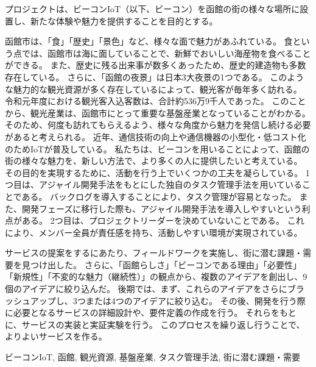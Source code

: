 \documentclass[openany,11pt,papersize]{jsbook}
\begin{document}
%
\maketitle

\frontmatter

\begin{jabstract} 
プロジェクトは、ビーコンIoT（以下、ビーコン）を函館の街の様々な場所に設置し、新たな体験や魅力を提供することを目的とする。

函館市は、「食」「歴史」「景色」など、様々な面で魅力があふれている。
食という点では、函館市は海に面していることで、新鮮でおいしい海産物を食べることができる。
また、歴史に残る出来事が数多くあったため、歴史的建造物も多数存在している。
さらに、「函館の夜景」は日本3大夜景の1つである。
このような魅力的な観光資源が多く存在しているによって、観光客が毎年多く訪れる。
令和元年度における観光客入込客数は、合計約536万9千人であった。
このことから、観光産業は、函館市にとって重要な基盤産業となっていることがわかる。
そのため、何度も訪れてもらえるよう、様々な角度から魅力を発信し続ける必要があると考えられる。
近年、通信技術の向上や通信機器の小型化・低コスト化のためIoTが普及している。
私たちは、ビーコンを用いることによって、函館の街の様々な魅力を、新しい方法で、より多くの人に提供したいと考えている。
その目的を実現するために、活動を行う上でいくつかの工夫を凝らしている。
1つ目は、アジャイル開発手法をもとにした独自のタスク管理手法を用いていることである。
バックログを導入することにより、タスク管理が容易となった。
また、開発フェーズに移行した際も、アジャイル開発手法を導入しやすいという利点がある。
2つ目は、プロジェクトリーダーを決めていないことである。
これにより、メンバー全員が責任感を持ち、活動しやすい環境が実現されている。

サービスの提案をするにあたり、フィールドワークを実施し、街に潜む課題・需要を見つけ出した。
さらに、「函館らしさ」「ビーコンである理由」「必要性」「新規性」「不変的な魅力（継続性）」の観点から、複数のアイデアを創出し、9個のアイデアに絞り込んだ。
後期では、まず、これらのアイデアをさらにブラッシュアップし、3つまたは4つのアイデアに絞り込む。
その後、開発を行う際に必要となるサービスの詳細設計や、要件定義の作成を行う。
それらをもとに、サービスの実装と実証実験を行う。
このプロセスを繰り返し行うことで、よりよいサービスを作る。

\begin{jkeyword}
ビーコンIoT, 函館, 観光資源, 基盤産業, タスク管理手法, 街に潜む課題・需要
\end{jkeyword}
\end{jabstract}
\end{document}
